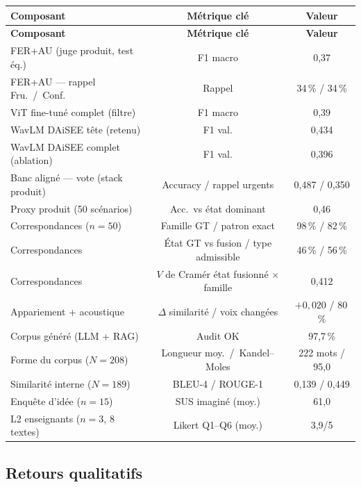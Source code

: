 {\small
\renewcommand{\arraystretch}{1.18}
\setlength{\tabcolsep}{4pt}
\begin{xltabular}{\textwidth}{|>{\raggedright\arraybackslash}X|c|c|}
\hline
{}
\textbf{Composant} & \textbf{Métrique clé} & \textbf{Valeur} \\
\hline
\endfirsthead
\hline
{}
\textbf{Composant} & \textbf{Métrique clé} & \textbf{Valeur} \\
\hline
\endhead
\endfoot
\endlastfoot
FER+AU (juge produit, test éq.) & F1 macro & 0{,}37 \\
\hline
FER+AU --- rappel Fru.\ /\ Conf. & Rappel & 34\,\% / 34\,\% \\
\hline
ViT fine-tuné complet (filtre) & F1 macro & 0{,}39 \\
\hline
WavLM DAiSEE tête (retenu) & F1 val. & 0{,}434 \\
\hline
WavLM DAiSEE complet (ablation) & F1 val. & 0{,}396 \\
\hline
Banc aligné --- vote (stack produit) & Accuracy / rappel urgents &
0{,}487 / 0{,}350 \\
\hline
Proxy produit (50 scénarios) & Acc.\ vs état dominant & 0{,}46 \\
\hline
Correspondances ($n=50$) & Famille GT / patron exact & 98\,\% / 82\,\% \\
\hline
Correspondances & État GT vs fusion / type admissible & 46\,\% / 56\,\% \\
\hline
Correspondances & $V$ de Cramér état fusionné $\times$ famille & 0{,}412 \\
\hline
Appariement + acoustique & $\Delta$ similarité / voix changées &
$+0{,}020$ / 80\,\% \\
\hline
Corpus généré (LLM + RAG) & Audit OK & 97{,}7\,\% \\
\hline
Forme du corpus ($N=208$) & Longueur moy.\ /\ Kandel--Moles &
222 mots / 95{,}0 \\
\hline
Similarité interne ($N=189$) & BLEU-4 / ROUGE-1 & 0{,}139 / 0{,}449 \\
\hline
Enquête d'idée ($n=15$) & SUS imaginé (moy.) & 61{,}0 \\
\hline
L2 enseignants ($n=3$, 8 textes) & Likert Q1--Q6 (moy.) & 3{,}9/5 \\
\hline
\end{xltabular}
\label{tab:synthese-val}
}

\subsection{Retours qualitatifs}

